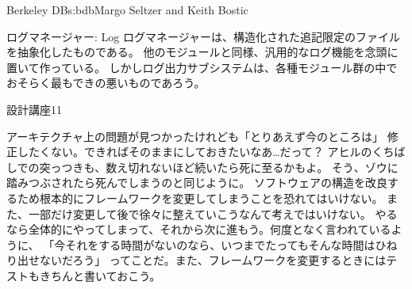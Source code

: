 \begin{aosachapter}{Berkeley DB}{s:bdb}{Margo Seltzer and Keith Bostic}
\begin{aosasect1}{ログマネージャー: Log}
ログマネージャーは、構造化された追記限定のファイルを抽象化したものである。
他のモジュールと同様、汎用的なログ機能を念頭に置いて作っている。
しかしログ出力サブシステムは、各種モジュール群の中でおそらく最もできの悪いものであろう。

\begin{aosabox}{設計講座11}

アーキテクチャ上の問題が見つかったけれども「とりあえず今のところは」
修正したくない。できればそのままにしておきたいなあ…だって？
アヒルのくちばしでの突っつきも、数え切れないほど続いたら死に至るかもよ。
そう、ゾウに踏みつぶされたら死んでしまうのと同じように。
ソフトウェアの構造を改良するため根本的にフレームワークを変更してしまうことを恐れてはいけない。
また、一部だけ変更して後で徐々に整えていこうなんて考えではいけない。
やるなら全体的にやってしまって、それから次に進もう。何度となく言われているように、
「今それをする時間がないのなら、いつまでたってもそんな時間はひねり出せないだろう」
ってことだ。また、フレームワークを変更するときにはテストもきちんと書いておこう。

\end{aosabox}


\end{aosasect1}
\end{aosachapter}
